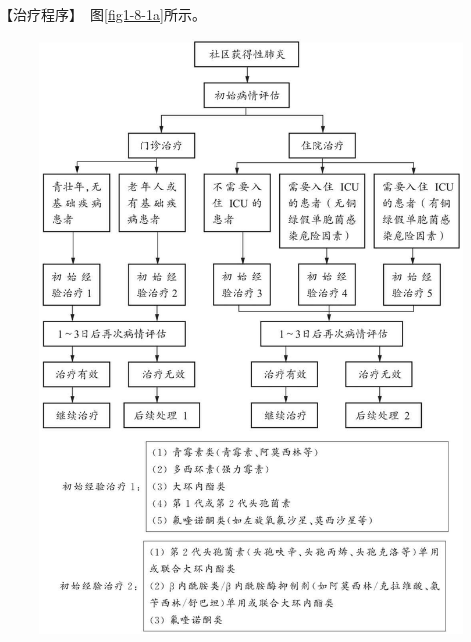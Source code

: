 【治疗程序】　图\ref{fig1-8-1a}所示。
  \begin{figure}[!htbp]
    \centering
    \begin{minipage}[b]{0.49\textwidth} 
      \centering
      \includegraphics{./images/Image00015.jpg}
    \end{minipage}
\begin{minipage}[b]{0.49\textwidth} 
  \centering

\end{minipage}
\end{figure}
